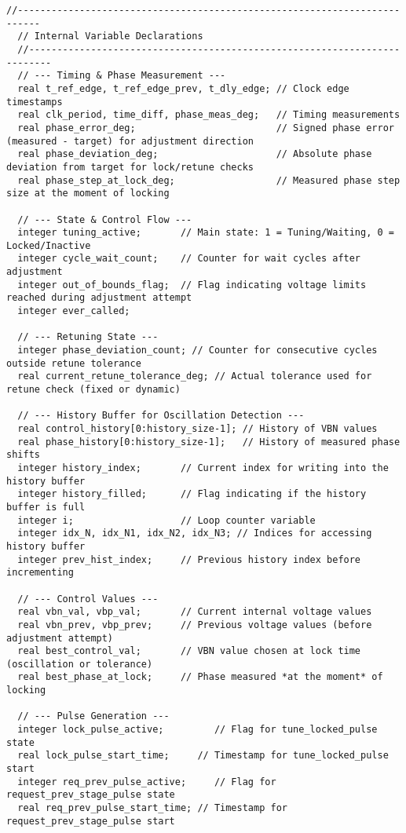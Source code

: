 \begin{lstlisting}[caption={Verilog-A Generic Vb Tuner Implementation}]
  //--------------------------------------------------------------------------
  // Internal Variable Declarations
  //--------------------------------------------------------------------------
  // --- Timing & Phase Measurement ---
  real t_ref_edge, t_ref_edge_prev, t_dly_edge; // Clock edge timestamps
  real clk_period, time_diff, phase_meas_deg;   // Timing measurements
  real phase_error_deg;                         // Signed phase error (measured - target) for adjustment direction
  real phase_deviation_deg;                     // Absolute phase deviation from target for lock/retune checks
  real phase_step_at_lock_deg;                  // Measured phase step size at the moment of locking

  // --- State & Control Flow ---
  integer tuning_active;       // Main state: 1 = Tuning/Waiting, 0 = Locked/Inactive
  integer cycle_wait_count;    // Counter for wait cycles after adjustment
  integer out_of_bounds_flag;  // Flag indicating voltage limits reached during adjustment attempt
  integer ever_called;

  // --- Retuning State ---
  integer phase_deviation_count; // Counter for consecutive cycles outside retune tolerance
  real current_retune_tolerance_deg; // Actual tolerance used for retune check (fixed or dynamic)

  // --- History Buffer for Oscillation Detection ---
  real control_history[0:history_size-1]; // History of VBN values
  real phase_history[0:history_size-1];   // History of measured phase shifts
  integer history_index;       // Current index for writing into the history buffer
  integer history_filled;      // Flag indicating if the history buffer is full
  integer i;                   // Loop counter variable
  integer idx_N, idx_N1, idx_N2, idx_N3; // Indices for accessing history buffer
  integer prev_hist_index;     // Previous history index before incrementing

  // --- Control Values ---
  real vbn_val, vbp_val;       // Current internal voltage values
  real vbn_prev, vbp_prev;     // Previous voltage values (before adjustment attempt)
  real best_control_val;       // VBN value chosen at lock time (oscillation or tolerance)
  real best_phase_at_lock;     // Phase measured *at the moment* of locking

  // --- Pulse Generation ---
  integer lock_pulse_active;         // Flag for tune_locked_pulse state
  real lock_pulse_start_time;     // Timestamp for tune_locked_pulse start
  integer req_prev_pulse_active;     // Flag for request_prev_stage_pulse state
  real req_prev_pulse_start_time; // Timestamp for request_prev_stage_pulse start


\end{lstlisting}
